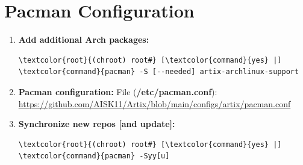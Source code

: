 \documentclass[10pt, a4paper, onecolumn, oneside, titlepage, openany]{book}
\begin{document}
\section{Pacman Configuration}
\begin{enumerate}
    \item \textbf{Add additional Arch packages:}
\begin{Verbatim}[commandchars=\\\{\}]
\textcolor{root}{(chroot) root#} [\textcolor{command}{yes} |] \textcolor{command}{pacman} -S [--needed] artix-archlinux-support
\end{Verbatim}
    \item \textbf{Pacman configuration:}
\newline File (\textbf{\textcolor{file}{/etc/pacman.conf}}):
\newline \url{https://github.com/AISK11/Artix/blob/main/configs/artix/pacman.conf}
    \item \textbf{Synchronize new repos [and update]:}
\begin{Verbatim}[commandchars=\\\{\}]
\textcolor{root}{(chroot) root#} [\textcolor{command}{yes} |] \textcolor{command}{pacman} -Syy[u]
\end{Verbatim}
\end{enumerate}
\end{document}
